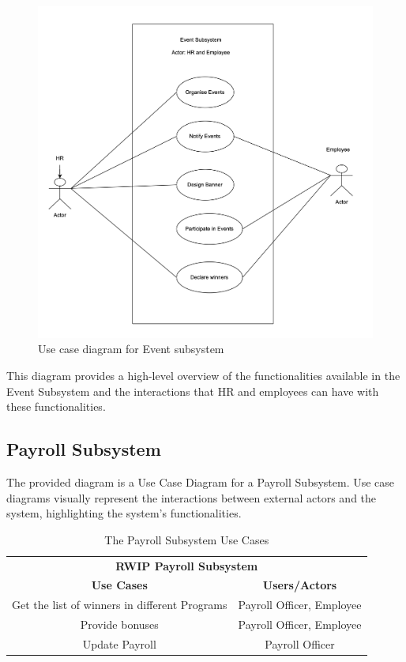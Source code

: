 \begin{figure}[h!t]
    \centering
    \includegraphics[width=\textwidth]
    {images/ucEvent.png}
    \caption{Use case diagram for Event subsystem}
    \label{fig:ucEvent}
\end{figure}

\FloatBarrier

This diagram provides a high-level overview of the functionalities available in the Event Subsystem and the interactions that HR and employees can have with these functionalities.

\subsection{Payroll Subsystem}
The provided diagram is a Use Case Diagram for a Payroll Subsystem. Use case diagrams visually represent the interactions between external actors and the system, highlighting the system's functionalities. 

\begin{table}[h!t]
\caption{The Payroll Subsystem Use Cases}
{%
\newcommand{\mc}[2]{\multicolumn{#1}{#2}}
\begin{center}
\begin{tabular}{|c|c|}
\hline
\multicolumn{2}{|c|}{\textbf{RWIP Payroll Subsystem}} \\ \cline{1-2}
\textbf{Use Cases} & \textbf{Users/Actors} \\
\hline
\rule{0pt}{24pt} Get the list of winners in different Programs & Payroll Officer, Employee\\
\hline
\rule{0pt}{24pt}  Provide bonuses & Payroll Officer, Employee \\
\hline
\rule{0pt}{24pt}  Update Payroll & Payroll Officer \\
\hline
\end{tabular}
\end{center}
}%
\label{tab:payroll}
\end{table}


